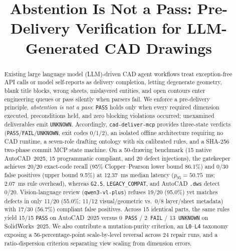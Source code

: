 \documentclass[nocopyright,nolists,upint,varvw,hyphenate]{asmejour}
\begin{document}

\title{Abstention Is Not a Pass: Pre-Delivery Verification for LLM-Generated CAD Drawings}


\begin{abstract}
Existing large language model (LLM)-driven CAD agent workflows treat exception-free API calls or model self-reports as delivery completion, letting degenerate geometry, blank title blocks, wrong sheets, mislayered entities, and open contours enter engineering queues or pass silently when parsers fail. We enforce a pre-delivery principle, \emph{abstention is not a pass}: {\upshape\texttt{PASS}} holds only when every required dimension executed, preconditions held, and zero blocking violations occurred; unexamined deliverables emit {\upshape\texttt{UNKNOWN}}. Accordingly, {\upshape\texttt{cad-deliver-mcp}} provides three-state verdicts ({\upshape\texttt{PASS}}/{\upshape\texttt{FAIL}}/{\upshape\texttt{UNKNOWN}}, exit codes 0/1/2), an isolated offline architecture requiring no CAD runtime, a seven-role drafting ontology with six calibrated rules, and a SHA-256 two-phase commit MCP state machine. On a 50-drawing benchmark (15 native AutoCAD~2025, 15 programmatic compliant, and 20 defect injections), the gatekeeper achieves 20/20 exact-code recall (95\% Clopper--Pearson lower bound 86.1\%) and 0/30 false positives (upper bound 9.5\%) at 12.37~ms median latency ($p_{95}=50.75$~ms; 2.07~ms rule overhead), whereas {\upshape\texttt{G2.5}}, {\upshape\texttt{LEGACY\_COMPAT}}, and AutoCAD {\upshape\texttt{.dws}} detect 0/20. Vision-language review ({\upshape\texttt{qwen3-vl-plus}}) refuses 19/20 (95.0\%) yet matches defects in only 11/20 (55.0\%; 11/12 visual/geometric vs.\ 0/8 layer/sheet metadata) with 17/30 (56.7\%) compliant false positives. Across 15 identical parts, the same rules yield 15/15 {\upshape\texttt{PASS}} on AutoCAD~2025 versus 0~{\upshape\texttt{PASS}} / 2~{\upshape\texttt{FAIL}} / 13~{\upshape\texttt{UNKNOWN}} on SolidWorks~2025. We also contribute a mutation-purity criterion, an {\upshape\texttt{L0}}--{\upshape\texttt{L4}} taxonomy exposing a 56-percentage-point scale-by-level reversal across 24 repair runs, and a ratio-dispersion criterion separating view scaling from dimension errors.
\end{abstract}
\end{document}
